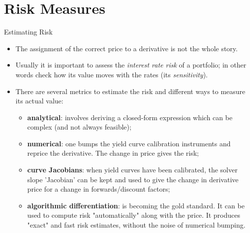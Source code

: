 \documentclass{beamer}
\begin{document}


\section{Risk Measures}
\begin{frame}{Estimating Risk}
	\begin{itemize}
		\item The assignment of the correct price to a derivative is not the whole story.
		\item Usually it is important to assess the \emph{interest rate risk} of a portfolio; in other words check how its value moves with the rates (its \emph{sensitivity}).
		\item There are several metrics to estimate the risk and different ways to measure its actual value:
		\begin{itemize}
			\item \textbf{analytical}: involves deriving a closed-form expression which can be complex (and not always feasible);
			\item \textbf{numerical}: one bumps the yield curve calibration instruments and reprice the derivative. The change in price gives the risk;
			\item \textbf{curve Jacobians}: when yield curves have been calibrated, the solver slope 'Jacobian' can be kept and used to give the change in derivative price for a change in forwards/discount factors;
			\item \textbf{algorithmic differentiation}: is becoming the gold standard. It can be used to compute risk "automatically" along with the price. It produces "exact" and fast risk estimates, without the noise of numerical bumping.
		\end{itemize}
		
	\end{itemize}
\end{frame}
\end{document}
